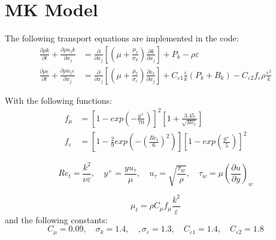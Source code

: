 \documentclass[paper=a4, fontsize=12pt]{scrartcl} %
\newcommand{\pd}{\partial }
\begin{document}
\section{MK Model}
The following transport equations are implemented in the code:
\begin{equation} \label{eq:ktDeng}
\begin{split}
\frac{\pd \rho k}{\pd t} + \frac{\pd \rho u_j k}{\pd x_j} &= \frac{\pd}{\pd x_j}\left[\left(\mu + \frac{\mu_t}{\sigma_k}\right)\frac{\pd k}{\pd x_j}\right] + P_{k}- \rho\varepsilon \\
\frac{\pd \rho \varepsilon}{\pd t} + \frac{\pd \rho u_j \varepsilon}{\pd x_j} &= \frac{\pd}{\pd x_j}\left[ \left(\mu + \frac{\mu_t}{\sigma_{\varepsilon}}\right)\frac{\pd \varepsilon_t}{\pd x_j}\right] + C_{\varepsilon1}\frac{\varepsilon}{k}\left(P_k+B_k\right)  -C_{\varepsilon2} f_{\varepsilon}\rho\frac{\varepsilon^2}{k}   
\end{split}
\end{equation}

With the following functions:
\begin{equation}
\begin{split}
    f_\mu &= \left[1-exp\left(-\frac{y^+}{70}\right)\right]^2\left[1+\frac{3.45}{\sqrt{Re_t}}\right] \\
    f_\varepsilon  &=\left[1-\frac{2}{9}exp\left(-\left(\frac{Re_t}{6}\right)^2\right)\right] \left[1-exp\left(\frac{y^+}{5}\right)\right]^2 
\end{split}
\end{equation}

\begin{equation}
Re_t = \frac{k^2}{\nu \varepsilon}, \quad y^+ =  \frac{y u_\tau}{\mu}, \quad u_\tau = \sqrt{\frac{\tau_w}{\rho}}, \quad \tau_w = \mu\left(\frac{\pd u}{\pd y}\right)_w
\end{equation}

\begin{equation}
\mu_t = \rho C_\mu f_\mu \frac{k^2}{\varepsilon}
\end{equation}
and the following constants:
\begin{equation}
C_\mu = 0.09, \quad \sigma_k = 1.4, \quad, \sigma_\varepsilon = 1.3, \quad C_{\varepsilon1} = 1.4, \quad C_{\varepsilon2}=1.8
\end{equation}
\end{document}
